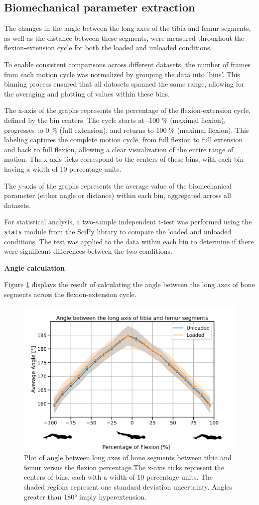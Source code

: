 \documentclass{micro-econ-thesis}
\begin{document}
\subsection{Biomechanical parameter extraction}
The changes in the angle between the long axes of the tibia and femur segments, as well as the distance between these segments, were measured throughout the flexion-extension cycle for both the loaded and unloaded conditions.

To enable consistent comparisons across different datasets, the number of frames from each motion cycle was normalized by grouping the data into 'bins'. This binning process ensured that all datasets spanned the same range, allowing for the averaging and plotting of values within these bins.

The x-axis of the graphs represents the percentage of the flexion-extension cycle, defined by the bin centers. The cycle starts at -100 \% (maximal flexion), progresses to 0 \% (full extension), and returns to 100 \% (maximal flexion). This labeling captures the complete motion cycle, from full flexion to full extension and back to full flexion, allowing a clear visualization of the entire range of motion. The x-axis ticks correspond to the centers of these bins, with each bin having a width of 10 percentage units. 

The y-axis of the graphs represents the average value of the biomechanical parameter (either angle or distance) within each bin, aggregated across all datasets. 

For statistical analysis, a two-sample independent t-test was performed using the \texttt{stats} module from the  SciPy library to compare the loaded and unloaded conditions. The test was applied to the data within each bin to determine if there were significant differences between the two conditions.

\textbf{Angle calculation}

Figure \ref{fig:anglegraphstickman} displays the result of calculating the angle between the long axes of bone segments across the flexion-extension cycle. 
 
\begin{figure}[H]
	\centering
	\includegraphics[width=0.7\linewidth]{angle_graph_stickman_modified}
	\caption{Plot of angle between long axes of bone segments between tibia and femur versus the flexion percentage.The x-axis ticks represent the centers of bins, each with a width of 10 percentage units. The shaded regions represent one standard deviation uncertainty. Angles greater than 180° imply hyperextension.}
	\label{fig:anglegraphstickman}
\end{figure}
\end{document}
